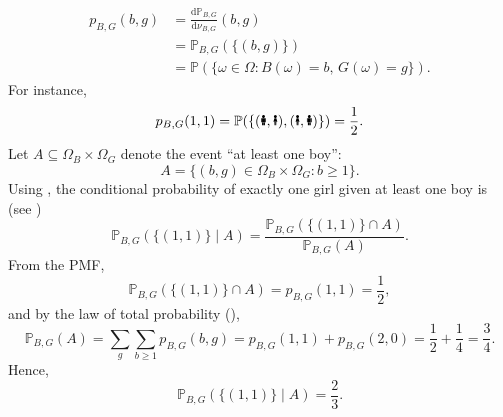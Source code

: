 \begin{example}
	\begin{equation}
		\begin{split}
			p_{B,G}(b,g) &= \frac{\mathrm{d}\mathbb{P}_{B,G}}{\mathrm{d}\nu_{B,G}}(b,g)\\
			& = \mathbb{P}_{B,G}(\{(b,g)\})\\
			& = \mathbb{P}(\{\omega \in \Omega \colon B(\omega)=b,\, G(\omega)=g\}).
		\end{split}
	\end{equation}
	For instance,
	\begin{equation}
		p_{B,G}(1,1)
		= \mathbb{P}(\{(\text{\Gentsroom},\text{\Ladiesroom}), (\text{\Ladiesroom},\text{\Gentsroom})\})
		= \frac{1}{2}.
	\end{equation}
	Let $A \subseteq \Omega_B \times \Omega_G$ denote the event ``at least one boy'':
	\begin{equation}
		A = \{(b,g) \in \Omega_B \times \Omega_G \colon b \ge 1\}.
	\end{equation}
	Using , the conditional probability of exactly one girl given at least one boy is (see )
	\begin{equation}
		\mathbb{P}_{B,G}(\{(1,1)\} \mid A)
		= \frac{\mathbb{P}_{B,G}(\{(1,1)\} \cap A)}{\mathbb{P}_{B,G}(A)}.
	\end{equation}
	From the PMF,
	\begin{equation}
		\mathbb{P}_{B,G}(\{(1,1)\} \cap A)
		= p_{B,G}(1,1)
		= \frac{1}{2},
	\end{equation}
	and by the law of total probability (),
	\begin{equation}
		\mathbb{P}_{B,G}(A)
		= \sum_{g} \sum_{b \ge 1} p_{B,G}(b,g)
		= p_{B,G}(1,1) + p_{B,G}(2,0)
		= \frac{1}{2} + \frac{1}{4}
		= \frac{3}{4}.
	\end{equation}
	Hence,
	\begin{equation}
		\mathbb{P}_{B,G}(\{(1,1)\} \mid A)
		= \frac{2}{3}.
	\end{equation}
\end{example}




